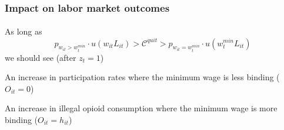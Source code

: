 \begin{frame}

    \frametitle{Impact on labor market outcomes} %
    \framesubtitle{}  %
    \rmfamily %

    \begin{wideitemize}
        \item As long as
        \[
            p_{w_{it} > w^{min}_t}\cdot u(w_{it}L_{it}) > \mathcal{C}^{quit} > p_{w_{it} = w^{min}_t}\cdot u(w^{min}_t L_{it})
        \]
        we should see (after \(z_{t} = 1\))
        \vspace{9pt}
        \begin{wideitemize}
            \item[\textcolor{fblu}{\textbullet}] An increase in participation rates where the minimum wage is less binding (\(O_{it} = 0\))
            \item[\textcolor{fblu}{\textbullet}] An increase in illegal opioid consumption where the minimum wage is more binding (\(O_{it} = h_{it}\))
        \end{wideitemize}

    \end{wideitemize}
    
\end{frame}

\begin{comment}
\begin{frame}

    \frametitle{Impact on labor market outcomes} %
    \framesubtitle{}  %
    \rmfamily %

    \begin{wideitemize}
        \item Assume for the moment that \textcolor{fblu}{the worker cannot quit opioids} and that \(l_{it} < o < h_{it}\)
        \item Then if the \textcolor{fblu}{minimum wage is binding} (\(w_{t} = w^{min}_t\)) and \textcolor{fblu}{the law is passed} (\(z_t = 1\))
        \[
        f(\theta_{it}) - \kappa < w^{min}_t \,\Rightarrow\, \text{unemployment}
        \]
        \vspace{-15pt}
        \item But if the \textcolor{fblu}{minimum wage is not binding} (\(w_{t} >> w^{min}_t\)) 
        \[
        f(\theta_{it}) - \kappa = w_t 
        \]
        \vspace{-15pt}
        \item What if the worker can quit opioids?
    \end{wideitemize}
    \hyperlink{quitting}{\beamerbutton{Quitting}} 

\end{frame}
\end{comment}
